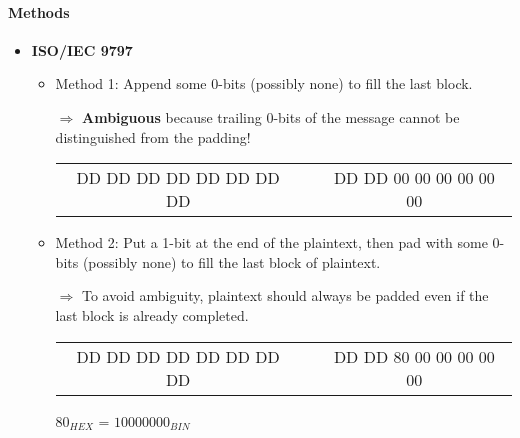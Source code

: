 \paragraph{Methods}

\begin{itemize}

    \item \textbf{ISO/IEC 9797}
        \begin{itemize}
            \item Method 1: Append some 0-bits (possibly none) to fill
                the last block.
                
                $\Rightarrow$ \textbf{Ambiguous} because trailing 0-bits
                of the message cannot be distinguished from the padding!
                \begin{center}
                    \begin{tabular}{|c|c|c|}
                        \cline{1-1} \cline{3-3}
                        DD DD DD DD DD DD DD DD & & DD DD
                        \textcolor{red!50!black}{00 00 00 00 00 00} \\
                        \cline{1-1} \cline{3-3}
                    \end{tabular}
                \end{center}
                
            \item Method 2: Put a 1-bit at the end of the plaintext, then pad with
                some 0-bits (possibly none) to fill the last block of plaintext. 
                
                $\Rightarrow$ To avoid ambiguity, plaintext should
                always be padded even if the last block is already
                completed.
                \begin{center}
                    \begin{tabular}{|c|c|c|}
                        \cline{1-1} \cline{3-3}
                        DD DD DD DD DD DD DD DD & & DD DD
                        \textcolor{green!50!black}{80}
                        \textcolor{red!50!black}{00 00 00 00 00} \\
                        \cline{1-1} \cline{3-3}
                    \end{tabular}
                \end{center}

                $80_{HEX}$ = $10000000_{BIN}$
        \end{itemize}


\end{itemize}
